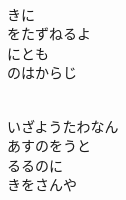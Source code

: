 \documentclass[10pt,b5j]{tarticle} %
\begin{document}
\begin{enumerate}
\begin{minipage}[c]{\blocksize}
    \end{minipage}
    \begin{minipage}[c]{\blocksize}
        
        \vspace{\linespace}
        \item~\\
        きに\\
        をたずねるよ\\
        にとも\\
        のはからじ
        
        \vspace{\linespace}
        \item~\\
        いざようたわなん\\
        あすのをうと\\
        るるのに\\
        きをさんや
    
    \end{minipage}
\end{enumerate} %
\end{document}
